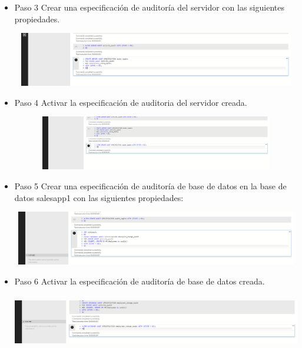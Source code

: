\begin{itemize}
				 \item Paso 3 Crear una especificación de auditoría del servidor con las siguientes propiedades.
				 
				 
				 \begin{center}
    				\includegraphics[width=16cm, height=90]{./Imagenes/Imagen3}
   				    \end{center}
				 
				 \item Paso 4 Activar la especificación de auditoria del servidor creada.
				 
				 
				 \begin{center}
    				\includegraphics[width=16cm, height=90]{./Imagenes/Imagen4}
   				    \end{center}
   				    	
   				    
   				 \item Paso 5 Crear una especificación de auditoría de base de datos en la base de datos salesapp1 con las siguientes propiedades:
				 
				 
				 \begin{center}
    				\includegraphics[width=16cm, height=90]{./Imagenes/Imagen5}
   				    \end{center}   		 
				 
				  \item Paso 6 Activar la especificación de auditoría de base de datos creada.
				 
				 \begin{center}
    				\includegraphics[width=16cm, height=90]{./Imagenes/Imagen6}
   				    \end{center} 
   				    

\end{itemize}
